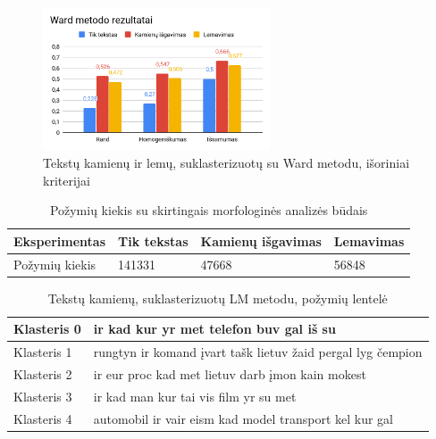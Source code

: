 \documentclass{VUMIFInfBakalaurinis}
\begin{document}
\begin{figure}[H]
	\centering
	\includegraphics[width=0.6\textwidth]{./img/image16.png}
  \caption{Tekstų kamienų ir lemų, suklasterizuotų su Ward metodu, išoriniai
  kriterijai}
\end{figure}

\begin{table}[H]
  \centering
\caption{Požymių kiekis su skirtingais morfologinės analizės būdais}
\small
\begin{tabular}{|l|l|l|l|}
\hline
Eksperimentas & Tik tekstas & Kamienų išgavimas & Lemavimas \\ \hline
Požymių kiekis        & 141331      & 47668             & 56848  \\  \hline
\end{tabular}
\normalsize
\end{table}

\begin{table}[H]
  \centering
\caption{Tekstų kamienų, suklasterizuotų LM metodu, požymių lentelė}
\small
\begin{tabular}{|l|l|}
\hline
Klasteris 0 & ir kad kur yr met telefon buv gal iš su                     \\ \hline
Klasteris 1 & rungtyn ir komand įvart tašk lietuv žaid pergal lyg čempion \\ \hline
Klasteris 2 & ir eur proc kad met lietuv darb įmon kain mokest            \\ \hline
Klasteris 3 & ir kad man kur tai vis film yr su met                       \\ \hline
Klasteris 4 & automobil ir vair eism kad model transport kel kur gal      \\ \hline
\end{tabular}
\normalsize
\end{table}
\end{document}
